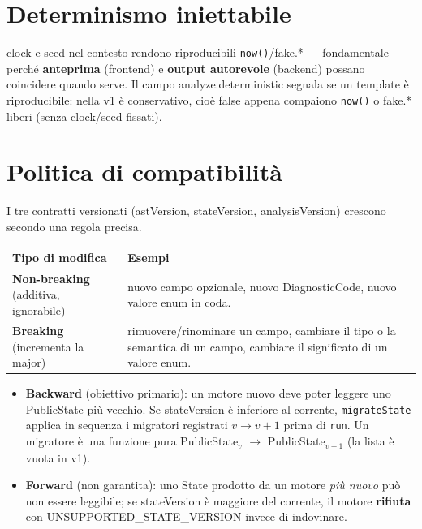 \documentclass[11pt,a4paper]{book}
\let\code\lstinline
\newcommand{\ic}[1]{{\ttfamily #1}}
\theoremstyle{definition}
\begin{document}
{{{{\section{Determinismo iniettabile}

\ic{clock} e \ic{seed} nel contesto rendono riproducibili \code|now()|/\ic{fake.*}
--- fondamentale perché \textbf{anteprima} (frontend) e \textbf{output autorevole}
(backend) possano coincidere quando serve. Il campo \ic{analyze.deterministic}
segnala se un template è riproducibile: nella v1 è conservativo, cioè \ic{false}
appena compaiono \code|now()| o \ic{fake.*} liberi (senza \ic{clock}/\ic{seed}
fissati).

\section{Politica di compatibilità}

I tre contratti versionati (\ic{astVersion}, \ic{stateVersion},
\ic{analysisVersion}) crescono secondo una regola precisa.

\begin{center}
\small
\begin{tabular}{@{}l p{9.6cm}@{}}
\toprule
\textbf{Tipo di modifica} & \textbf{Esempi} \\
\midrule
\textbf{Non-breaking} (additiva, ignorabile) & nuovo campo opzionale, nuovo
\ic{DiagnosticCode}, nuovo valore enum in coda. \\
\textbf{Breaking} (incrementa la major) & rimuovere/rinominare un campo, cambiare il
tipo o la semantica di un campo, cambiare il significato di un valore enum. \\
\bottomrule
\end{tabular}
\end{center}

\begin{itemize}
  \item \textbf{Backward} (obiettivo primario): un motore nuovo deve poter leggere
    uno \ic{PublicState} più vecchio. Se \ic{stateVersion} è inferiore al corrente,
    \code|migrateState| applica in sequenza i migratori registrati $v \rightarrow
    v+1$ prima di \code|run|. Un migratore è una funzione pura
    \ic{PublicState}$_v$ $\rightarrow$ \ic{PublicState}$_{v+1}$ (la lista è vuota in
    v1).
  \item \textbf{Forward} (non garantita): uno \ic{State} prodotto da un motore
    \emph{più nuovo} può non essere leggibile; se \ic{stateVersion} è maggiore del
    corrente, il motore \textbf{rifiuta} con \ic{UNSUPPORTED\_STATE\_VERSION} invece
    di indovinare.
\end{itemize}

}}}}
\end{document}
